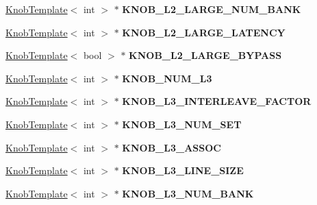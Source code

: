 \begin{DoxyCompactItemize}
\item 
\hypertarget{classall__knobs__c_ac884761a3dbb3bafd8ac413f4809781c}{
\hyperlink{classKnobTemplate}{KnobTemplate}$<$ int $>$ $\ast$ {\bfseries KNOB\_\-L2\_\-LARGE\_\-NUM\_\-BANK}}
\label{classall__knobs__c_ac884761a3dbb3bafd8ac413f4809781c}

\item 
\hypertarget{classall__knobs__c_af93da6879b4f2e8eb16c6fd9091eab40}{
\hyperlink{classKnobTemplate}{KnobTemplate}$<$ int $>$ $\ast$ {\bfseries KNOB\_\-L2\_\-LARGE\_\-LATENCY}}
\label{classall__knobs__c_af93da6879b4f2e8eb16c6fd9091eab40}

\item 
\hypertarget{classall__knobs__c_a76e8b9ec4ffe0e4057d7968612eed8ec}{
\hyperlink{classKnobTemplate}{KnobTemplate}$<$ bool $>$ $\ast$ {\bfseries KNOB\_\-L2\_\-LARGE\_\-BYPASS}}
\label{classall__knobs__c_a76e8b9ec4ffe0e4057d7968612eed8ec}

\item 
\hypertarget{classall__knobs__c_a94429be7fe431aa2315618176a680ec3}{
\hyperlink{classKnobTemplate}{KnobTemplate}$<$ int $>$ $\ast$ {\bfseries KNOB\_\-NUM\_\-L3}}
\label{classall__knobs__c_a94429be7fe431aa2315618176a680ec3}

\item 
\hypertarget{classall__knobs__c_ad8863f748bb403eae535b8b997a7dcae}{
\hyperlink{classKnobTemplate}{KnobTemplate}$<$ int $>$ $\ast$ {\bfseries KNOB\_\-L3\_\-INTERLEAVE\_\-FACTOR}}
\label{classall__knobs__c_ad8863f748bb403eae535b8b997a7dcae}

\item 
\hypertarget{classall__knobs__c_a758d46611ed4e13d16bb0c5f94ac9de3}{
\hyperlink{classKnobTemplate}{KnobTemplate}$<$ int $>$ $\ast$ {\bfseries KNOB\_\-L3\_\-NUM\_\-SET}}
\label{classall__knobs__c_a758d46611ed4e13d16bb0c5f94ac9de3}

\item 
\hypertarget{classall__knobs__c_a39a94f0ba624adee0551884e201f14be}{
\hyperlink{classKnobTemplate}{KnobTemplate}$<$ int $>$ $\ast$ {\bfseries KNOB\_\-L3\_\-ASSOC}}
\label{classall__knobs__c_a39a94f0ba624adee0551884e201f14be}

\item 
\hypertarget{classall__knobs__c_ad096b590b67ade11b85972ab5b81366f}{
\hyperlink{classKnobTemplate}{KnobTemplate}$<$ int $>$ $\ast$ {\bfseries KNOB\_\-L3\_\-LINE\_\-SIZE}}
\label{classall__knobs__c_ad096b590b67ade11b85972ab5b81366f}

\item 
\hypertarget{classall__knobs__c_aa3c2a6844df823eaf2d49bcbbd5b2a33}{
\hyperlink{classKnobTemplate}{KnobTemplate}$<$ int $>$ $\ast$ {\bfseries KNOB\_\-L3\_\-NUM\_\-BANK}}
\label{classall__knobs__c_aa3c2a6844df823eaf2d49bcbbd5b2a33}


\end{DoxyCompactItemize}
